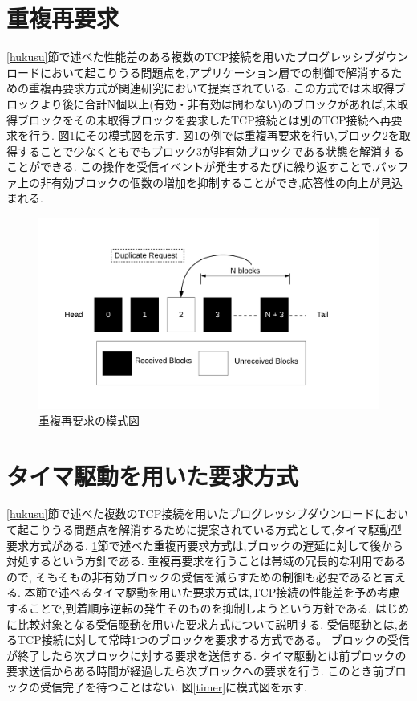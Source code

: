 \documentclass[a4j,12pt]{gradthesis_utf8}
\begin{document}
 \section{重複再要求}
 \label{juhuku}
 \ref{hukusu}節で述べた性能差のある複数のTCP接続を用いたプログレッシブダウンロードにおいて起こりうる問題点を,アプリケーション層での制御で解消するための重複再要求方式が関連研究\cite{proxy}において提案されている.
 この方式では未取得ブロックより後に合計N個以上(有効・非有効は問わない)のブロックがあれば,未取得ブロックをその未取得ブロックを要求したTCP接続とは別のTCP接続へ再要求を行う.
 図\ref{blockdup}にその模式図を示す.
 図\ref{blockdup}の例では重複再要求を行い,ブロック2を取得することで少なくともでもブロック3が非有効ブロックである状態を解消することができる.
 この操作を受信イベントが発生するたびに繰り返すことで,バッファ上の非有効ブロックの個数の増加を抑制することができ,応答性の向上が見込まれる.
 
 \begin{figure}[ht]
     \centering
     \includegraphics[width=18.5cm]{figure/block_dup.pdf}
     \caption{重複再要求の模式図}
     \label{blockdup}
 \end{figure}

\newpage
 
\section{タイマ駆動を用いた要求方式}
\ref{hukusu}節で述べた複数のTCP接続を用いたプログレッシブダウンロードにおいて起こりうる問題点を解消するために提案されている方式として,タイマ駆動型要求方式がある\cite{horiba}.
\ref{juhuku}節で述べた重複再要求方式は,ブロックの遅延に対して後から対処するという方針である.
重複再要求を行うことは帯域の冗長的な利用であるので,
そもそもの非有効ブロックの受信を減らすための制御も必要であると言える.
本節で述べるタイマ駆動を用いた要求方式は,TCP接続の性能差を予め考慮することで,到着順序逆転の発生そのものを抑制しようという方針である.
はじめに比較対象となる受信駆動を用いた要求方式について説明する.
受信駆動とは,あるTCP接続に対して常時1つのブロックを要求する方式である。
ブロックの受信が終了したら次ブロックに対する要求を送信する.
タイマ駆動とは前ブロックの要求送信からある時間が経過したら次ブロックへの要求を行う.
このとき前ブロックの受信完了を待つことはない.
図\ref{timer}に模式図を示す.
\end{document}
